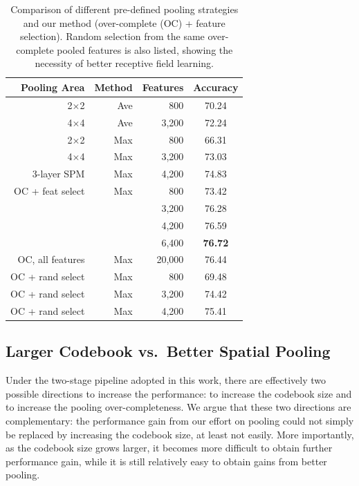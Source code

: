 \begin{table}
  \centering
  \begin{tabular}{r|r|r|c}
    \hline
    Pooling Area & Method & Features & Accuracy\\
    \hline
    2$\times$2 & Ave & 800 & 70.24\\
    4$\times$4 & Ave & 3,200 & 72.24\\
    2$\times$2 & Max & 800 & 66.31\\
    4$\times$4 & Max & 3,200 & 73.03\\
    3-layer SPM & Max & 4,200 & 74.83\\ %
    \hline
    OC + feat select & Max & 800 & 73.42\\
                  &     & 3,200 & 76.28\\
                  &     & 4,200 & 76.59\\
                  &     & 6,400 & {\bfseries 76.72}\\
    \hline
    OC, all features & Max & 20,000 & 76.44\\ %
    OC + rand select & Max & 800 & 69.48\\ %
    OC + rand select & Max & 3,200 & 74.42\\ %
    OC + rand select & Max & 4,200 & 75.41\\ %
    \hline
  \end{tabular}
  \caption{Comparison of different pre-defined pooling strategies and our method (over-complete (OC) + feature selection). Random selection from the same over-complete pooled features is also listed, showing the necessity of better receptive field learning.}\label{table:gridsize}
\end{table}

\subsection{Larger Codebook vs.\ Better Spatial Pooling}
Under the two-stage pipeline adopted in this work, there are effectively two possible directions to increase the performance: to increase the codebook size and to increase the pooling over-completeness. We argue that these two directions are complementary: the performance gain from our effort on pooling could not simply be replaced by increasing the codebook size, at least not easily. More importantly, as the codebook size grows larger, it becomes more difficult to obtain further performance gain, while it is still relatively easy to obtain gains from better pooling.

